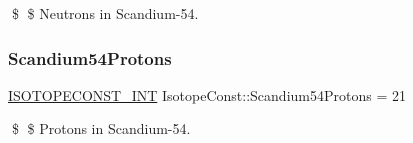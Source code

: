 \$ \$ Neutrons in Scandium-\/54. \mbox{\label{group___isotope_const-_scandium-_sc54_ga9ad760a2b1da010402d7cab82ac48be2}} 
\subsubsection{\texorpdfstring{Scandium54\+Protons}{Scandium54Protons}}
{\footnotesize\ttfamily \mbox{\hyperlink{group___isotope_const-_macros_ga5f18360b3e99483a35c32d789e62621c}{I\+S\+O\+T\+O\+P\+E\+C\+O\+N\+S\+T\+\_\+\+I\+NT}} Isotope\+Const\+::\+Scandium54\+Protons = 21}

\$ \$ Protons in Scandium-\/54. 